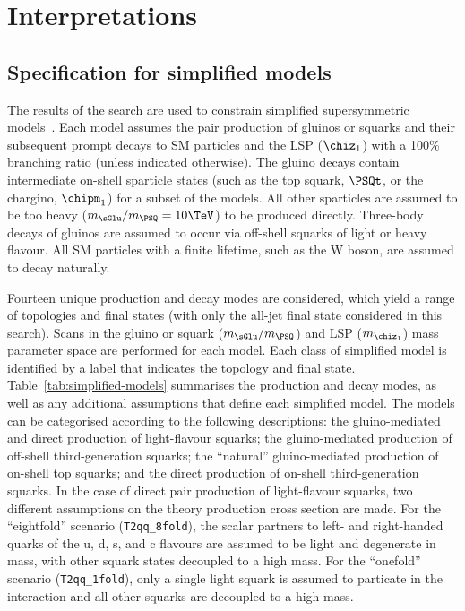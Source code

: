 \clearpage
\section{Interpretations} 
\label{sec:interpretations}

\subsection{Specification for simplified models} 

The results of the search are used to constrain simplified
supersymmetric models~\cite{Alwall:2008ag, Alwall:2008va, sms}. Each
model assumes the pair production of gluinos or squarks and their
subsequent prompt decays to SM particles and the LSP ($\chiz_1$) with
a 100\% branching ratio (unless indicated otherwise). The gluino
decays contain intermediate on-shell sparticle states (such as the top
squark, $\PSQt$, or the chargino, $\chipm_1$) for a subset of the
models. All other sparticles are assumed to be too heavy ($m_{\sGlu} /
m_{\PSQ} = 10\TeV$) to be produced directly. Three-body decays of
gluinos are assumed to occur via off-shell squarks of light or heavy
flavour. All SM particles with a finite lifetime, such as the W boson,
are assumed to decay naturally.

Fourteen unique production and decay modes are considered, which yield
a range of topologies and final states (with only the all-jet final
state considered in this search). Scans in the gluino or squark
($m_{\sGlu} / m_{\PSQ}$) and LSP ($m_{\chiz_1}$) mass parameter space
are performed for each model. Each class of simplified model is
identified by a label that indicates the topology and final state.
Table~\ref{tab:simplified-models} summarises the production and decay
modes, as well as any additional assumptions that define each
simplified model. The models can be categorised according to the
following descriptions: the gluino-mediated and direct production of
light-flavour squarks; the gluino-mediated production of off-shell
third-generation squarks; the ``natural'' gluino-mediated production
of on-shell top squarks; and the direct production of on-shell
third-generation squarks. In the case of direct pair production of
light-flavour squarks, two different assumptions on the theory
production cross section are made. For the ``eightfold'' scenario
(\texttt{T2qq\_8fold}), the scalar partners to left- and right-handed
quarks of the u, d, s, and c flavours are assumed to be light and
degenerate in mass, with other squark states decoupled to a high
mass. For the ``onefold'' scenario (\texttt{T2qq\_1fold}), only a
single light squark is assumed to particate in the interaction and all
other squarks are decoupled to a high mass.


